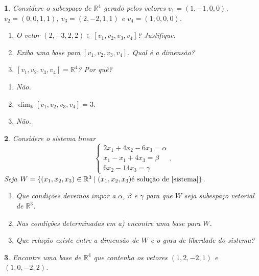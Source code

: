 \documentclass[12pt]{exam}
\newtheorem{exercicio}{}
\newcommand{\real}{\mathbb{R}}
\begin{document}
\begin{exercicio}
  Considere o subespa\c{c}o de $\real^4$ gerado pelos vetores $v_1 = (1, -1, 0, 0)$, $v_2 = (0, 0, 1, 1)$, $v_3 = (2, -2, 1, 1)$ e $v_4 = (1, 0, 0, 0)$.
  \begin{enumerate}[label={\alph*})]
    \item O vetor $(2, -3, 2, 2) \in [v_1, v_2, v_3, v_4]$? Justifique.
    \item Exiba uma base para $[v_1, v_2, v_3, v_4]$. Qual \'e a dimens\~ao?
    \item $[v_1, v_2, v_3, v_4] = \real^4$? Por qu\^e?
  \end{enumerate}
  \begin{solucao}
    \begin{enumerate}[label={\alph*})]
      \item N\~ao.
      \item $\dim_\real [v_1, v_2, v_3, v_4] = 3$.
      \item N\~ao.
    \end{enumerate}
  \end{solucao}
\end{exercicio}


\begin{exercicio}
  Considere o sistema linear
  \begin{equation}\label{sistema}
    \begin{cases}
      2x_1 + 4x_2 - 6x_3 = \alpha\\
      x_1 - x_1 + 4x_3 = \beta\\
      6x_2 - 14x_3 = \gamma
    \end{cases}.
  \end{equation}
  Seja $W = \{(x_1, x_2, x_3) \in \real^3 \mid (x_1, x_2, x_3) \mbox{\'e solu\c{c}\~ao de } \eqref{sistema}\}$.
  \begin{enumerate}[label={\alph*})]
    \item Que condi\c{c}\~oes devemos impor a $\alpha$, $\beta$ e $\gamma$ para que $W$ seja subespa\c{c}o vetorial de $\real^3$.
    \item Nas condi\c{c}\~oes determinadas em \textit{a)} encontre uma base para $W$.
    \item Que rela\c{c}\~ao existe entre a dimens\~ao de $W$ e o grau de liberdade do sistema?
  \end{enumerate}
\end{exercicio}

\begin{exercicio}
  Encontre uma base de $\real^4$ que contenha os vetores $(1,2,-2,1)$ e $(1,0,-2,2)$.
\end{exercicio}
\end{document}
